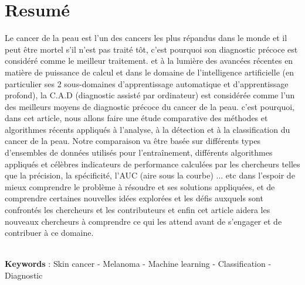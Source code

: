 \section*{Resumé}
Le cancer de la peau est l'un des cancers les plus répandus dans le monde et il peut être mortel s'il n'est pas traité tôt, c'est pourquoi son diagnostic précoce est considéré comme le meilleur traitement. et à la lumière des avancées récentes en matière de puissance de calcul et dans le domaine de l'intelligence artificielle (en particulier ses 2 sous-domaines d'apprentissage automatique et d'apprentissage profond), la C.A.D (diagnostic assisté par ordinateur) est considérée comme l'un des meilleurs moyens de diagnostic précoce du cancer de la peau. c'est pourquoi, dans cet article, nous allons faire une étude comparative des méthodes et algorithmes récents appliqués à l'analyse, à la détection et à la classification du cancer de la peau. Notre comparaison va être basée sur différents types d'ensembles de données utilisés pour l'entraînement, différents algorithmes appliqués et célèbres indicateurs de performance calculées par les chercheurs telles que la précision, la spécificité, l'AUC (aire sous la courbe) ... etc dans l'espoir de mieux comprendre le problème à résoudre et ses solutions appliquées, et de comprendre certaines nouvelles idées explorées et les défis auxquels sont confrontés les chercheurs et les contributeurs et enfin cet article aidera les nouveaux chercheurs à comprendre ce qui les attend avant de s'engager et de contribuer à ce domaine.

\bigskip
\hrulefill \\
\textbf{Keywords} : Skin cancer - Melanoma - Machine learning - Classification - Diagnostic \\
\vspace{1cm}
\hrulefill \\
